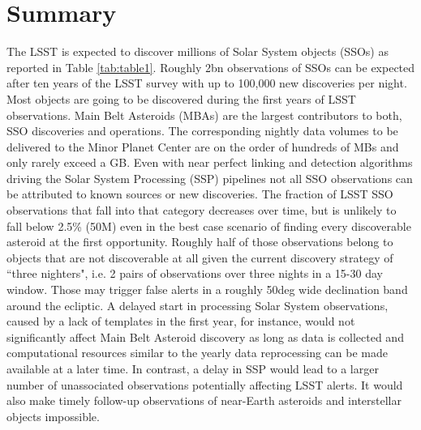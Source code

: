 \section{Summary} \label{sec:abstract}

The \gls{LSST} is expected to discover millions of Solar System objects (SSOs) as reported in Table \ref{tab:table1}.
Roughly 2bn observations of SSOs can be expected after ten years of the \gls{LSST} survey with up to 100,000 new discoveries per night. Most objects are going to be discovered during the first years of \gls{LSST} observations. Main Belt Asteroids (MBAs) are the largest contributors to both, \gls{SSO} discoveries and operations.
The corresponding nightly data volumes to be delivered to the Minor Planet \gls{Center} are on the order of hundreds of MBs and only rarely exceed a \gls{GB}.
Even with near perfect linking and detection algorithms driving the Solar System Processing (\gls{SSP}) pipelines not all \gls{SSO} observations can be attributed to known sources or new discoveries.
The fraction of \gls{LSST} \gls{SSO} observations that fall into that category decreases over time, but is unlikely to fall below 2.5\% (50M) even in the best case scenario of finding every discoverable asteroid at the first opportunity. Roughly half of those observations belong to objects that are not discoverable at all given the current discovery strategy of ``three nighters", i.e. 2 pairs of observations over three nights in a 15-30 day window. Those may trigger false alerts in a roughly 50deg wide \gls{declination} band around the ecliptic. A delayed start in processing Solar System observations, caused by a lack of templates in the first year, for instance, would not significantly affect Main Belt Asteroid discovery as long as data is collected and computational resources similar to the yearly data reprocessing can be made available at a later time. In contrast, a delay in \gls{SSP} would lead to a larger number of unassociated observations potentially affecting \gls{LSST} alerts. It would also make timely follow-up observations of near-Earth asteroids and interstellar objects impossible. 

